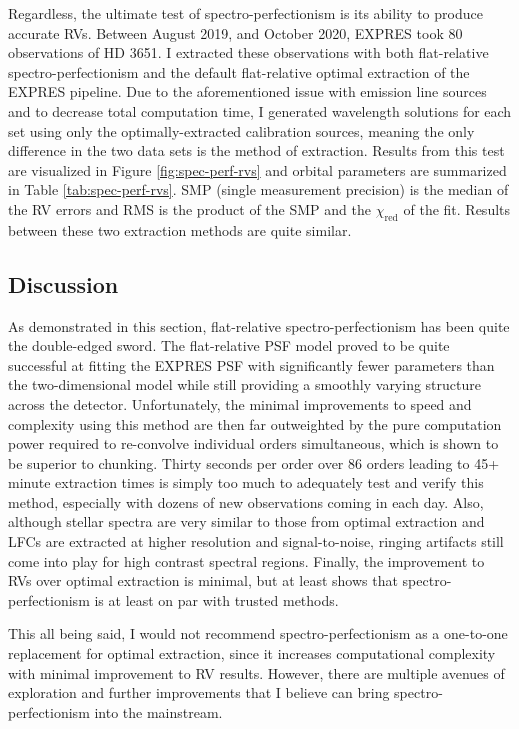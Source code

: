 Regardless, the ultimate test of spectro-perfectionism is its ability to produce accurate RVs. Between August 2019, and October 2020, EXPRES took 80 observations of HD 3651. I extracted these observations with both flat-relative spectro-perfectionism and the default flat-relative optimal extraction of the EXPRES pipeline. Due to the aforementioned issue with emission line sources and to decrease total computation time, I generated wavelength solutions for each set using only the optimally-extracted calibration sources, meaning the only difference in the two data sets is the method of extraction. Results from this test are visualized in Figure \ref{fig:spec-perf-rvs} and orbital parameters are summarized in Table \ref{tab:spec-perf-rvs}. SMP (single measurement precision) is the median of the RV errors and RMS is the product of the SMP and the $\chi_\mathrm{red}$ of the fit. Results between these two extraction methods are quite similar.

\subsection{Discussion}

As demonstrated in this section, flat-relative spectro-perfectionism has been quite the double-edged sword. The flat-relative PSF model proved to be quite successful at fitting the EXPRES PSF with significantly fewer parameters than the two-dimensional model while still providing a smoothly varying structure across the detector. Unfortunately, the minimal improvements to speed and complexity using this method are then far outweighted by the pure computation power required to re-convolve individual orders simultaneous, which is shown to be superior to chunking. Thirty seconds per order over 86 orders leading to 45+ minute extraction times is simply too much to adequately test and verify this method, especially with dozens of new observations coming in each day. Also, although stellar spectra are very similar to those from optimal extraction and LFCs are extracted at higher resolution and signal-to-noise, ringing artifacts still come into play for high contrast spectral regions. Finally, the improvement to RVs over optimal extraction is minimal, but at least shows that spectro-perfectionism is at least on par with trusted methods.

This all being said, I would not recommend spectro-perfectionism as a one-to-one replacement for optimal extraction, since it increases computational complexity with minimal improvement to RV results. However, there are multiple avenues of exploration and further improvements that I believe can bring spectro-perfectionism into the mainstream.

